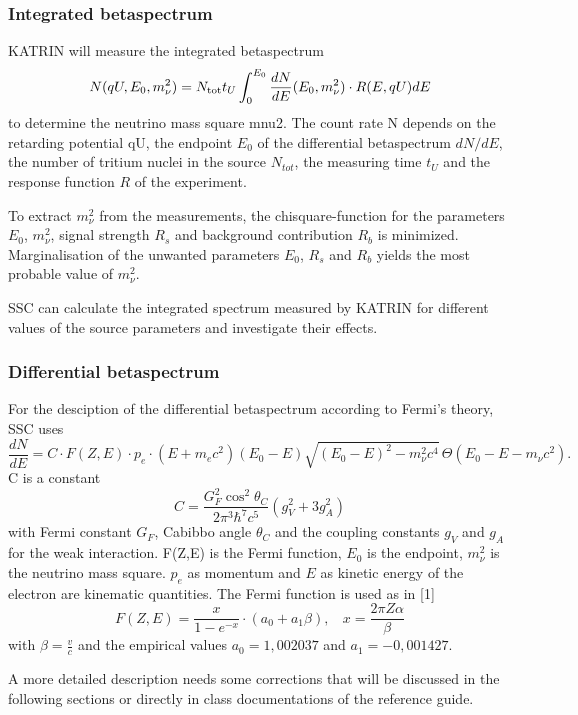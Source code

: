 \subsubsection{Integrated betaspectrum}\label{_s_s_cmain_intbetaspec}
KATRIN will measure the integrated betaspectrum \[ N(qU, E_0, m^2_\nu) = N_{\rm{tot}} t_U \int^{E_0}_0 \frac{dN}{dE}(E_0, m^2_\nu) \cdot R(E, qU) dE \] to determine the neutrino mass square mnu2. The count rate N depends on the retarding potential qU, the endpoint $E_0$ of the differential betaspectrum $dN/dE$, the number of tritium nuclei in the source $N_{tot}$, the measuring time $t_U$ and the response function $R$ of the experiment.\par
 To extract $m_{\nu}^2$ from the measurements, the chisquare-\/function for the parameters $E_0$, $m_{\nu}^2$, signal strength $R_s$ and background contribution $R_b$ is minimized. Marginalisation of the unwanted parameters $E_0$, $R_s$ and $R_b$ yields the most probable value of $m_\nu^2$.\par
 SSC can calculate the integrated spectrum measured by KATRIN for different values of the source parameters and investigate their effects.

\subsubsection{Differential betaspectrum}\label{_s_s_cmain_diffbetaspec}
For the desciption of the differential betaspectrum according to Fermi's theory, SSC uses \[ \frac{dN}{dE}=C\cdot F(Z,E)\cdot p_e \cdot (E + m_e c^2)(E_0-E)\sqrt{(E_0-E)^2-m_{\nu}^2 c^4}\,\Theta(E_0-E-m_\nu c^2). \label{eq:diffbetaspektrum} \] C is a constant \[ C= \frac{G_F^2\cos^2{\theta_C}}{2\pi^3\hbar^7 c^5}(g_V^2 + 3g_A^2) \label{eq:betakonstante} \] with Fermi constant $G_F$, Cabibbo angle $\theta_C$ and the coupling constants $g_V$ and $g_A$ for the weak interaction. F(Z,E) is the Fermi function, $E_0$ is the endpoint, $m_{\nu}^2$ is the neutrino mass square. $p_e$ as momentum and $E$ as kinetic energy of the electron are kinematic quantities. The Fermi function is used as in \mbox{[}1\mbox{]} \[ F(Z,E)=\frac{x}{1 - e^{-x}}\cdot(a_0 + a_1 \beta), ~~~~ x = \frac{2\pi Z \alpha}{\beta} \] with $\beta=\frac{v}{c}$ and the empirical values $a_0 = 1,002037$ and $a_1 = -0,001427$.

A more detailed description needs some corrections that will be discussed in the following sections or directly in class documentations of the reference guide. 

